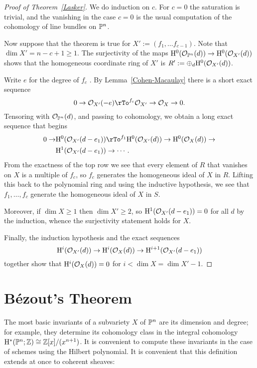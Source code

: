 \documentclass[12pt, leqno]{book}
\begin{document}
\begin{proof} [Proof of Theorem~\ref{Lasker}] We do induction on $c$. For $c=0$ the saturation is trivial, and the vanishing in the case $c=0$ is the usual computation of the cohomology of line bundles on $\PP^{n}$. 

Now suppose that the theorem is true for $X' := (f_{1}, \dots f_{c-1})$. Note that $\dim X' = n-c+1\geq 1$.
 The surjectivity of 
the maps $\HH^{0}(\cO_{\PP^{n}}(d)) \to \HH^{0}(\cO_{X'}(d))$ shows that the homogeneous coordinate ring
of $X'$ is $R':=\oplus_{d} \HH^{0}(\cO_{X'}(d))$.

Write $e$ for the degree of $f_{c}$ . By Lemma~\ref{Cohen-Macaulay} there is a short
exact sequence
$$
0\to \cO_{X'}(-e) \rTo^{f_{c}} \cO_{X'} \to \cO_{X} \to 0.
$$
Tensoring with $\cO_{\PP^{n}}(d)$, and passing to cohomology, we obtain a long exact sequence that begins
\begin{align*}
0\to &\HH^{0}(\cO_{X'}(d-e_{1})) \rTo^{f_{1}}  \HH^{0}(\cO_{X'}(d)) \to  \HH^{0}(\cO_{X}(d))\to\\
&\HH^{1}(\cO_{X'}(d-e_{1}))\to \cdots .
\end{align*}
From the exactness of the top row we see that every element of $R$ 
that vanishes on $X$ is a multiple of $f_{c}$, so $f_{c}$ generates the homogeneous ideal of $X$ in $R$.
Lifting this back to the polynomial ring and using
 the inductive hypothesis, we see that $f_{1},\dots, f_{c}$ generate the homogeneous ideal of
$X$ in $S$.

Moreover, if $\dim X\geq 1$ then $\dim X' \geq 2$, so $\HH^{1}(\cO_{X'}(d-e_{1})) = 0$ for all $d$ by the induction,
whence the surjectivity statement holds for $X$.

Finally, the induction hypothesis and the exact sequences
$$
\HH^{i}(\cO_{X'}(d)) \to  \HH^{i}(\cO_{X}(d))\to \HH^{i+1}(\cO_{X'}(d-e_{1}))
$$
together show that $\HH^{i}(\cO_{X}(d)) = 0$ for $i<\dim X = \dim X'-1$.

\end{proof}

\section{B\'ezout's Theorem}

The most basic invariants of a subvariety $X$ of $\PP^{n}$ are its dimension and degree; for example, they determine its cohomology class in the integral cohomology $\HH^{*}(\PP^{n}; \ZZ) \cong \ZZ[x]/(x^{n+1})$.  It is convenient to compute these invariants in the case of schemes using the Hilbert polynomial. It is convenient that this definition extends at once to coherent sheaves:
\end{document}
